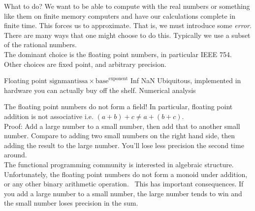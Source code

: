 \documentclass{beamer}
\begin{document}


\begin{frame}{What to do?}
We want to be able to compute with the real numbers or something like them on finite memory computers and 
have our calculations complete in finite time. This forces us to approximate. That is, we must introduce
some \emph{error}. \\
There are many ways that one might choose to do this. Typically we use a subset of
the rational numbers. \\
The dominant choice is the floating point numbers, in particular IEEE 754. \\
Other choices are fixed point, and arbitrary precision.
\end{frame}

\begin{frame}{Floating point}
$\text{sign} \text{mantissa} \times \text{base}^\text{exponent}$ Inf NaN
Ubiquitous, implemented in hardware you can actually buy off the shelf.
Numerical analysis
\end{frame}

\begin{frame}{The floating point numbers do not form a field!}
In particular, floating point addition is not associative i.e. $(a + b) + c \ne a + (b + c)$. \\
Proof: Add a large number to a small number, then add that to another small number.
Compare to adding two small numbers on the right hand side, then adding the result to the large number.
You'll lose less precision the second time around. \\
The functional programming community is interested in algebraic structure. Unfortunately, the floating
point numbers do not form a monoid under addition, or any other binary arithmetic operation. \
This has important consequences. If you add a large number to a small number, the large number tends to win
and the small number loses precision in the sum.
\end{frame}
\end{document}
